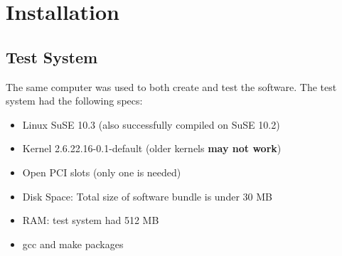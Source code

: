 \documentclass[11pt]{article}
\begin{document}



\section{Installation} \label{install}

\subsection{Test System} \label{requirements}
The same computer was used to both create and test the software.  The test system had the following specs:
\begin{itemize}
 \item Linux SuSE 10.3 (also successfully compiled on SuSE 10.2)
 \item Kernel 2.6.22.16-0.1-default (older kernels \textbf{may not work})
 \item Open PCI slots (only one is needed)
 \item Disk Space: Total size of software bundle is under 30 MB
 \item RAM: test system had 512 MB
 \item gcc and make packages
\end{itemize}
\end{document}

